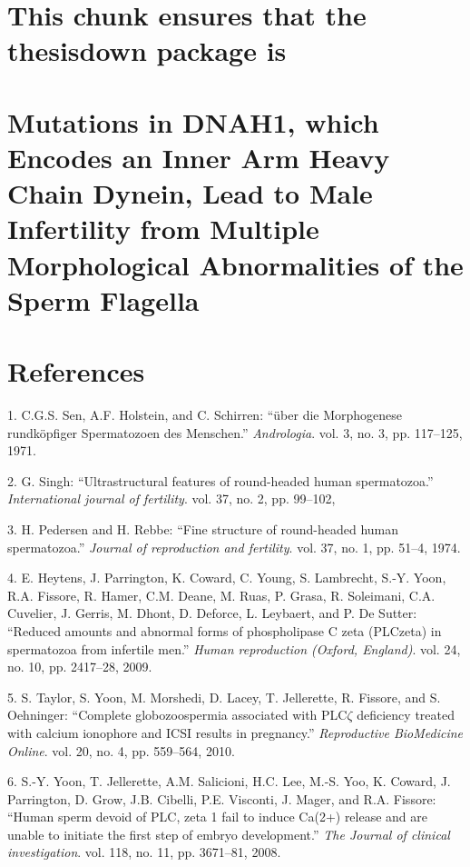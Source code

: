 \documentclass[12pt,twoside]{ugathesis}
\begin{document}
\chapter{This chunk ensures that the thesisdown package
is}\label{this-chunk-ensures-that-the-thesisdown-package-is}

\chapter{Mutations in DNAH1, which Encodes an Inner Arm Heavy Chain
Dynein, Lead to Male Infertility from Multiple Morphological
Abnormalities of the Sperm Flagella}\label{dnah12014}

\chapter*{References}\label{references}

\hypertarget{refs}{}
\hypertarget{ref-Sen2009}{}
1. C.G.S. Sen, A.F. Holstein, and C. Schirren: ``über die Morphogenese
rundköpfiger Spermatozoen des Menschen.'' \emph{Andrologia}. vol. 3, no.
3, pp. 117--125, 1971.

\hypertarget{ref-Singh}{}
2. G. Singh: ``Ultrastructural features of round-headed human
spermatozoa.'' \emph{International journal of fertility}. vol. 37, no.
2, pp. 99--102,

\hypertarget{ref-Pedersen1974}{}
3. H. Pedersen and H. Rebbe: ``Fine structure of round-headed human
spermatozoa.'' \emph{Journal of reproduction and fertility}. vol. 37,
no. 1, pp. 51--4, 1974.

\hypertarget{ref-Heytens2009}{}
4. E. Heytens, J. Parrington, K. Coward, C. Young, S. Lambrecht, S.-Y.
Yoon, R.A. Fissore, R. Hamer, C.M. Deane, M. Ruas, P. Grasa, R.
Soleimani, C.A. Cuvelier, J. Gerris, M. Dhont, D. Deforce, L. Leybaert,
and P. De Sutter: ``Reduced amounts and abnormal forms of phospholipase
C zeta (PLCzeta) in spermatozoa from infertile men.'' \emph{Human
reproduction (Oxford, England)}. vol. 24, no. 10, pp. 2417--28, 2009.

\hypertarget{ref-Taylor2010}{}
5. S. Taylor, S. Yoon, M. Morshedi, D. Lacey, T. Jellerette, R. Fissore,
and S. Oehninger: ``Complete globozoospermia associated with
PLC\(\zeta\) deficiency treated with calcium ionophore and ICSI results
in pregnancy.'' \emph{Reproductive BioMedicine Online}. vol. 20, no. 4,
pp. 559--564, 2010.

\hypertarget{ref-Yoon2008}{}
6. S.-Y. Yoon, T. Jellerette, A.M. Salicioni, H.C. Lee, M.-S. Yoo, K.
Coward, J. Parrington, D. Grow, J.B. Cibelli, P.E. Visconti, J. Mager,
and R.A. Fissore: ``Human sperm devoid of PLC, zeta 1 fail to induce
Ca(2+) release and are unable to initiate the first step of embryo
development.'' \emph{The Journal of clinical investigation}. vol. 118,
no. 11, pp. 3671--81, 2008.
\end{document}

